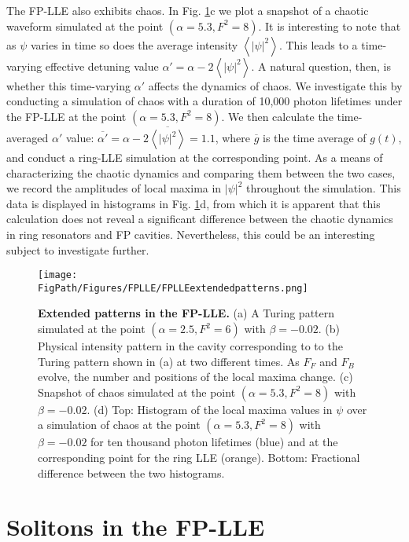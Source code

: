 The FP-LLE also exhibits chaos. In Fig. \ref{fig:FPLLEextendedpatterns}c we plot a snapshot of a chaotic waveform simulated at the point $(\alpha=5.3, F^2=8)$. It is interesting to note that as $\psi$ varies in time so does the average intensity $\left<|\psi|^2\right>$. This leads to a time-varying effective detuning value $\alpha'=\alpha-2\left<|\psi|^2\right>$. A natural question, then, is whether this time-varying $\alpha'$ affects the dynamics of chaos. We investigate this by conducting a simulation of chaos with a duration of 10,000 photon lifetimes under the FP-LLE at the point $(\alpha=5.3, F^2=8)$. We then calculate the time-averaged $\alpha'$ value: $\overline{\alpha'}=\alpha-2\overline{\left<|\psi|^2\right>}=1.1$, where $\overline{g}$ is the time average of $g(t)$, and conduct a ring-LLE simulation at the corresponding point. As a means of characterizing the chaotic dynamics and comparing them between the two cases, we record the amplitudes of local maxima in $|\psi|^2$ throughout the simulation. This data is displayed in histograms in Fig. \ref{fig:FPLLEextendedpatterns}d, from which it is apparent that this calculation does not reveal a significant difference between the chaotic dynamics in ring resonators and FP cavities. Nevertheless, this could be an interesting subject to investigate further. 


\begin{figure}[htpb]
	\begin{center}
		\texttt{[image: \\FigPath/Figures/FPLLE/FPLLEextendedpatterns.png]}
	\end{center}
	\caption[Extended patterns in the FP-LLE]{\textbf{Extended patterns in the FP-LLE.} (a) A Turing pattern simulated at the point $(\alpha=2.5,F^2=6)$ with $\beta=-0.02$. (b) Physical intensity pattern in the cavity corresponding to to the Turing pattern shown in (a) at two different times. As $F_F$ and $F_B$ evolve, the number and positions of the local maxima change. (c) Snapshot of chaos simulated at the point $(\alpha=5.3,F^2=8)$ with $\beta=-0.02$. (d) Top: Histogram of the local maxima values in $\psi$ over a simulation of chaos at the point $(\alpha=5.3,F^2=8)$ with $\beta=-0.02$ for ten thousand photon lifetimes (blue) and at the corresponding point for the ring LLE (orange). Bottom: Fractional difference between the two histograms.}
	\label{fig:FPLLEextendedpatterns}
\end{figure} 

\section{Solitons in the FP-LLE}


